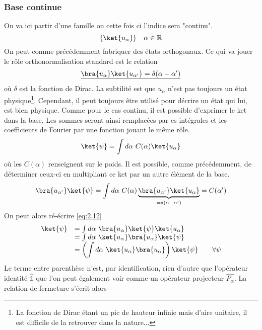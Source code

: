 \subsubsection{Base continue}
On va ici partir d'une famille ou cette fois ci l'indice sera "continu". 
\begin{equation}
\{\ket{u_\alpha}\}\quad \alpha\in\mathbb{R}
\end{equation}
On peut comme précédemment fabriquer des états orthogonaux. Ce qui va jouer 
le rôle orthonormalisation standard est le relation
\begin{equation}
\underline{\bra{u_\alpha}\ket{u_{\alpha'}} = \delta(\alpha-\alpha')}
\end{equation}
où $\delta$ est la fonction de Dirac. La subtilité est que $u_\alpha$ n'est 
pas toujours un état physique\footnote{La fonction de Dirac étant un pic de hauteur infinie
mais d'aire unitaire, il est difficile de la retrouver dans la nature...}.
 Cependant, il peut toujours être utilisé pour 
décrire un état qui lui, est bien physique. Comme pour le cas continu, il 
est possible d'exprimer le ket dans la base. Les sommes seront ainsi 
remplacées par es intégrales et les coefficients de Fourier par une fonction 
jouant le même rôle.
\begin{equation}
\ket{\psi} = \int d\alpha\ C(\alpha)\ket{u_\alpha}
\label{eq:2.12}
\end{equation}
où les $C(\alpha)$ renseignent sur le poids. Il est possible, comme précédemment, 
de déterminer ceux-ci en multipliant ce ket par un autre élément de la base.
\begin{equation}
\bra{u_{\alpha'}}\ket{\psi} = \int d\alpha\ C(\alpha) \underbrace{
\bra{u_{\alpha'}}\ket{u_\alpha}}_{=\delta(\alpha-\alpha')} = C(\alpha')
\end{equation}
On peut alors ré-écrire \autoref{eq:2.12}
\begin{equation}
\begin{array}{ll}
\ket{\psi} &= \int d\alpha\ \bra{u_\alpha}\ket{\psi}\ket{u_\alpha}\\
&= \int d\alpha\ \ket{u_\alpha}\bra{u_\alpha}\ket{\psi}\\
&=\displaystyle\left(\int d\alpha\ \ket{u_\alpha}\bra{u_\alpha}\right)\ket{\psi}
\qquad \forall\psi
\end{array}
\end{equation}
Le terme entre parenthèse n'est, par identification, rien d'autre que l'opérateur 
identité $\hat{\mathbb{1}}$ que l'on peut également voir comme un opérateur projecteur
$\hat{P_\alpha}$. La relation de fermeture s'écrit alors
